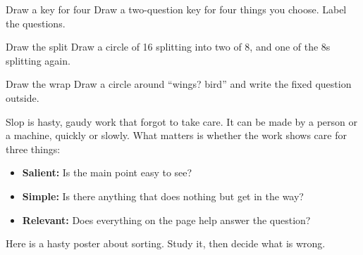 \begin{puzzle}{Draw a key for four}
Draw a two-question key for four things you choose. Label the questions.
\begin{center}\end{center}
\end{puzzle}

\begin{puzzle}{Draw the split}
Draw a circle of 16 splitting into two of 8, and one of the 8s splitting again.
\begin{center}\end{center}
\end{puzzle}

\begin{puzzle}{Draw the wrap}
Draw a circle around ``wings? bird'' and write the fixed question outside.
\begin{center}\end{center}
\end{puzzle}

\clearpage
\thispagestyle{fancy}\label{slop}
Slop is hasty, gaudy work that forgot to take care. It can be made by a person or a machine, quickly or slowly. What matters is whether the work shows care for three things:
\begin{itemize}[leftmargin=1.6em]
\item \textbf{Salient:} Is the main point easy to see?
\item \textbf{Simple:} Is there anything that does nothing but get in the way?
\item \textbf{Relevant:} Does everything on the page help answer the question?
\end{itemize}

Here is a hasty poster about sorting. Study it, then decide what is wrong.

